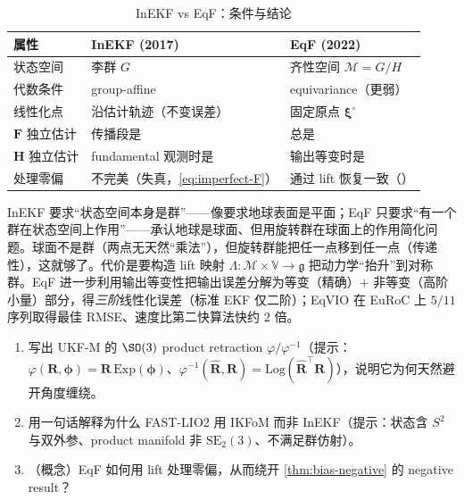 \begin{table}[H]\centering\small
\caption{InEKF vs EqF：条件与结论}
\label{tab:inekf-eqf}
\begin{tabular}{lll}
\toprule
属性 & InEKF (2017) & EqF (2022) \\
\midrule
状态空间 & 李群 $G$ & 齐性空间 $\mathcal{M}=G/H$ \\
代数条件 & group-affine & equivariance（更弱） \\
线性化点 & 沿估计轨迹（不变误差） & 固定原点 $\boldsymbol{\xi}^\circ$ \\
$\mathbf{F}$ 独立估计 & 传播段是 & 总是 \\
$\mathbf{H}$ 独立估计 & fundamental 观测时是 & 输出等变时是 \\
处理零偏 & 不完美（失真，\cref{eq:imperfect-F}） & 通过 lift 恢复一致（\cite{fornasier2022overcoming}） \\
\bottomrule
\end{tabular}
\end{table}

\begin{insight}[直觉类比]
InEKF 要求“状态空间本身是群”——像要求地球表面是平面；EqF 只要求“有一个群在状态空间上作用”——承认地球是球面、但用旋转群在球面上的作用简化问题。球面不是群（两点无天然“乘法”），但旋转群能把任一点移到任一点（传递性），这就够了。代价是要构造 lift 映射 $\Lambda:\mathcal{M}\times\mathbb{V}\to\mathfrak{g}$ 把动力学“抬升”到对称群。EqF 进一步利用输出等变性把输出误差分解为等变（精确）$+$ 非等变（高阶小量）部分，得\emph{三阶}线性化误差（标准 EKF 仅二阶）；EqVIO\cite{vangoor2023eqvio} 在 EuRoC 上 $5/11$ 序列取得最佳 RMSE、速度比第二快算法快约 $2$ 倍。
\end{insight}

\begin{practice}
\begin{enumerate}
  \item 写出 UKF-M 的 $\SO(3)$ product retraction $\varphi/\varphi^{-1}$（提示：$\varphi(\mathbf{R},\boldsymbol{\phi})=\mathbf{R}\,\mathrm{Exp}(\boldsymbol{\phi})$、$\varphi^{-1}(\hat{\mathbf{R}},\mathbf{R})=\mathrm{Log}(\hat{\mathbf{R}}^\top\mathbf{R})$），说明它为何天然避开角度缠绕。
  \item 用一句话解释为什么 FAST-LIO2 用 IKFoM 而非 InEKF（提示：状态含 $S^2$ 与双外参、product manifold 非 $\mathrm{SE}_2(3)$、不满足群仿射）。
  \item （概念）EqF 如何用 lift 处理零偏，从而绕开 \cref{thm:bias-negative} 的 negative result？
\end{enumerate}
\end{practice}

